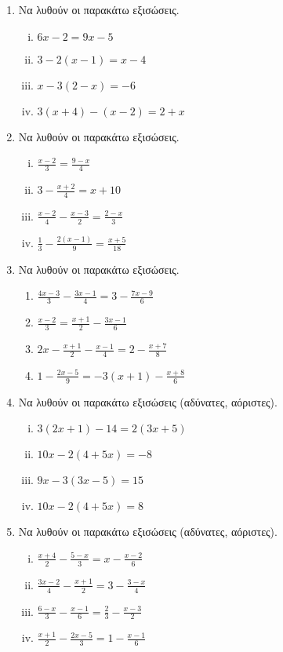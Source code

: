 \begin{enumerate}
  \item  Να λυθούν οι παρακάτω εξισώσεις.
    \begin{enumerate}[i)]
      \item $ 6x-2=9x-5 $
      \item $ 3-2(x-1)=x-4 $
      \item $ x-3(2-x)=-6 $
      \item $ 3(x+4)-(x-2) = 2+x $
    \end{enumerate}

  \item  Να λυθούν οι παρακάτω εξισώσεις.
    \begin{enumerate}[i)]
      \item $ \frac{x-2}{3} = \frac{9-x}{4} $
      \item $ 3 - \frac{x+2}{4} = x+10 $
      \item $ \frac{x-2}{4} - \frac{x-3}{2} = \frac{2-x}{3} $
      \item $ \frac{1}{3} - \frac{2(x-1)}{9} = \frac{x+5}{18} $
    \end{enumerate}

  \item  Να λυθούν οι παρακάτω εξισώσεις.
    \begin{enumerate}
      \item $ \frac{4x-3}{3} - \frac{3x-1}{4} = 3 - \frac{7x-9}{6} $
      \item $ \frac{x-2}{3} = \frac{x+1}{2} - \frac{3x-1}{6} $
      \item $ 2x- \frac{x+1}{2} - \frac{x-1}{4} = 2 - \frac{x+7}{8} $ 
      \item $ 1 - \frac{2x-5}{9} = -3(x+1) - \frac{x+8}{6} $
    \end{enumerate}

  \item  Να λυθούν οι παρακάτω εξισώσεις (αδύνατες, αόριστες).
    \begin{enumerate}[i)]
      \item $ 3(2x+1) - 14 = 2(3x+5) $
      \item $ 10x-2(4+5x) =-8 $ 
      \item $ 9x-3(3x-5)=15 $
      \item $ 10x-2(4+5x) = 8 $
    \end{enumerate}

  \item  Να λυθούν οι παρακάτω εξισώσεις (αδύνατες, αόριστες).
    \begin{enumerate}[i)]
      \item $ \frac{x+4}{2} - \frac{5-x}{3} = x - \frac{x-2}{6} $
      \item $ \frac{3x-2}{4} - \frac{x+1}{2} = 3 - \frac{3-x}{4} $
      \item $ \frac{6-x}{3} - \frac{x-1}{6} = \frac{2}{3} - \frac{x-3}{2} $
      \item $ \frac{x+1}{2} - \frac{2x-5}{3} = 1 - \frac{x-1}{6} $
    \end{enumerate}
    

\end{enumerate}
